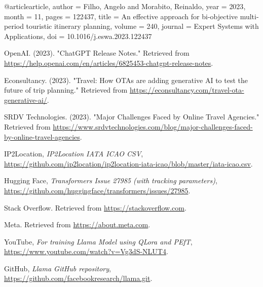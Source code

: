 \documentclass[conference]{IEEEtran}
\begin{document}
\newpage

\begin{thebibliography}{1}

        @article{article,
        author = {Filho, Angelo and Morabito, Reinaldo},
        year = {2023},
        month = {11},
        pages = {122437},
        title = {An effective approach for bi-objective multi-period touristic itinerary planning},
        volume = {240},
        journal = {Expert Systems with Applications},
        doi = {10.1016/j.eswa.2023.122437}
        }

        OpenAI. (2023). "ChatGPT Release Notes." Retrieved from \url{https://help.openai.com/en/articles/6825453-chatgpt-release-notes}.

        Econsultancy. (2023). "Travel: How OTAs are adding generative AI to test the future of trip planning." Retrieved from \url{https://econsultancy.com/travel-ota-generative-ai/}.

        SRDV Technologies. (2023). "Major Challenges Faced by Online Travel Agencies." Retrieved from \url{https://www.srdvtechnologies.com/blog/major-challenges-faced-by-online-travel-agencies}.

        IP2Location, \emph{IP2Location IATA ICAO CSV}, \href{https://github.com/ip2location/ip2location-iata-icao/blob/master/iata-icao.csv}{https://github.com/ip2location/ip2location-iata-icao/blob/master/iata-icao.csv}.

        Hugging Face, \emph{Transformers Issue 27985 (with tracking parameters)}, \href{https://github.com/huggingface/transformers/issues/27985}{https://github.com/huggingface/transformers/issues/27985}.

        Stack Overflow. Retrieved from \url{https://stackoverflow.com}.

        Meta. Retrieved from \url{https://about.meta.com}.

        YouTube, \emph{For training Llama Model using QLora and PEfT}, \href{https://www.youtube.com/watch?v=Vg3dS-NLUT4}{https://www.youtube.com/watch?v=Vg3dS-NLUT4}.

        GitHub, \emph{Llama GitHub repository}, \href{https://github.com/facebookresearch/llama.git}{https://github.com/facebookresearch/llama.git}.


\end{thebibliography}
\end{document}
